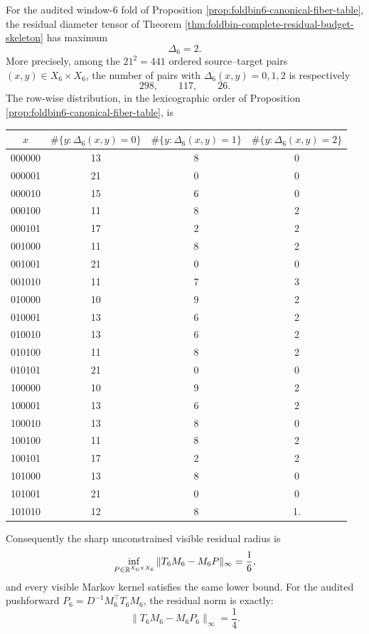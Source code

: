 \begin{theorem}\label{thm:foldbin6-exact-residual-diameter-distribution}
For the audited window-\(6\) fold of Proposition \ref{prop:foldbin6-canonical-fiber-table}, the residual diameter tensor of Theorem \ref{thm:foldbin-complete-residual-budget-skeleton} has maximum
\[
\Delta_6=2.
\]
More precisely, among the \(21^2=441\) ordered source--target pairs \((x,y)\in X_6\times X_6\), the number of pairs with \(\Delta_6(x,y)=0,1,2\) is respectively
\[
298,
\qquad
117,
\qquad
26.
\]
The row-wise distribution, in the lexicographic order of Proposition \ref{prop:foldbin6-canonical-fiber-table}, is
\begin{center}
\scriptsize
\setlength{\tabcolsep}{3pt}
\renewcommand{\arraystretch}{1.08}
\begin{tabular}{c|ccc}
\(x\)&\(\#\{y:\Delta_6(x,y)=0\}\)&\(\#\{y:\Delta_6(x,y)=1\}\)&\(\#\{y:\Delta_6(x,y)=2\}\)\\ \hline
000000&13&8&0\\
000001&21&0&0\\
000010&15&6&0\\
000100&11&8&2\\
000101&17&2&2\\
001000&11&8&2\\
001001&21&0&0\\
001010&11&7&3\\
010000&10&9&2\\
010001&13&6&2\\
010010&13&6&2\\
010100&11&8&2\\
010101&21&0&0\\
100000&10&9&2\\
100001&13&6&2\\
100010&13&8&0\\
100100&11&8&2\\
100101&17&2&2\\
101000&13&8&0\\
101001&21&0&0\\
101010&12&8&1.
\end{tabular}
\end{center}
Consequently the sharp unconstrained visible residual radius is
\[
\inf_{P\in\mathbb{R}^{X_6\times X_6}}\|T_6M_6-M_6P\|_\infty=\frac{1}{6},
\]
and every visible Markov kernel satisfies the same lower bound.  For the audited pushforward \(P_6=D^{-1}M_6^\top T_6M_6\), the residual norm is exactly:
\[
\|T_6M_6-M_6P_6\|_\infty=\frac14.
\]
\end{theorem}
